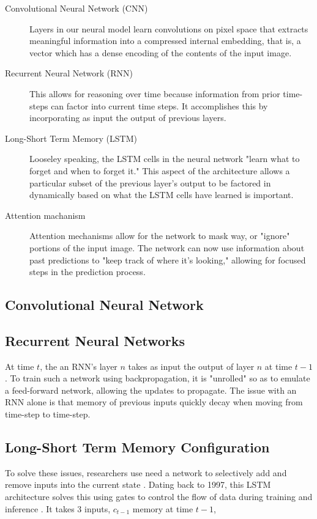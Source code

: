\documentclass{article}
\begin{document}
\begin{description}
  \item[Convolutional Neural Network (CNN)] Layers in our neural model learn
  convolutions on pixel space that extracts meaningful information into a
  compressed internal embedding, that is, a vector which has a dense encoding of
  the contents of the input image.
  \item[Recurrent Neural Network (RNN)] This allows for reasoning over time
  because information from prior time-steps can factor into current time steps.
  It accomplishes this by incorporating as input the output of previous layers.
  \item[Long-Short Term Memory (LSTM)] Looseley speaking, the LSTM cells in the
  neural network "learn what to forget and when to forget it." This aspect of
  the architecture allows a particular subset of the previous layer's output to
  be factored in dynamically based on what the LSTM cells have learned is
  important.
  \item[Attention machanism] Attention mechanisms allow for the network to mask
  way, or "ignore" portions of the input image. The network can now use
  information about past predictions to "keep track of where it's looking," allowing
  for focused steps in the prediction process.
\end{description}

\subsection{Convolutional Neural Network}

\subsection{Recurrent Neural Networks}

At time $t$, the an RNN's layer $n$ takes as input the output of layer $n$ at
time $t-1$. To train such a network using backpropagation, it is "unrolled" so
as to emulate a feed-forward network, allowing the updates to propagate. The
issue with an RNN alone is that memory of previous inputs quickly decay when
moving from time-step to time-step. 

\subsection{Long-Short Term Memory Configuration}

To solve these issues, researchers use need a network to selectively add and
remove inputs into the current state \parencite{zhang2019dive}. Dating back to
1997, this LSTM architecture solves this using gates to control the flow of data
during training and inference \parencite{zhang2019dive}. It takes 3 inputs,
$c_{t-1}$ memory at time $t-1$, %
\end{document}
